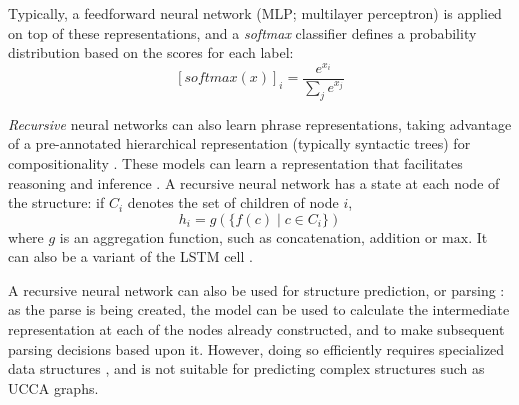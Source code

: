 \documentclass[12pt,a4paper,table]{report}
\renewcommand\cite{\citep}      %
\begin{document}
Typically, a feedforward neural network (MLP; multilayer perceptron) is applied on top
of these representations, and a \textit{softmax} classifier defines a probability
distribution based on the scores for each label:
\[[softmax(x)]_i = \frac{e^{x_i}}{\sum_je^{x_j}}\]

\textit{Recursive} neural networks can also learn phrase representations, taking advantage
of a pre-annotated hierarchical representation (typically syntactic trees) for
compositionality \cite{socher2010learning}.
These models can learn a representation that facilitates reasoning and inference \cite{bowman2014recursive}.
A recursive neural network has a state at each node of the structure: if $C_i$ denotes the set of children of
node $i$,
\[
  h_i=g(\{f(c)\;|\;c\in C_i\})
\]
where $g$ is an aggregation function, such as concatenation, addition or $\mathrm{max}$.
It can also be a variant of the LSTM cell \cite{tai-etal-2015-improved}.

A recursive neural network can also be used for structure prediction, or parsing
\cite{socher2013recursive,dyer2015transition}: as the parse is being created, the model can
be used to calculate the intermediate representation at each of the nodes already constructed,
and to make subsequent parsing decisions based upon it.
However, doing so efficiently requires specialized data structures \cite{bowman2016fast},
and is not suitable for predicting complex structures such as UCCA graphs.
\end{document}
